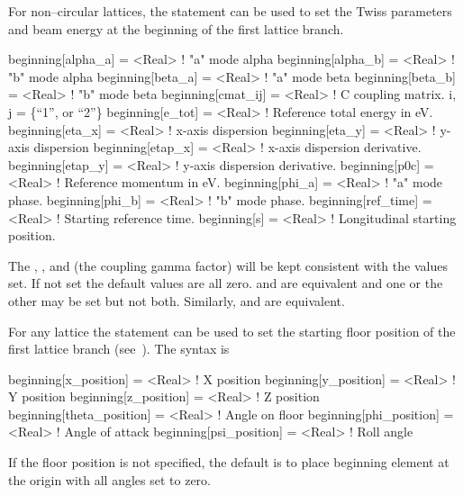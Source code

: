 For non--circular lattices, the  statement can be used to
set the Twiss parameters and beam energy at the beginning of the first lattice branch.
\begin{example}
  beginning[alpha_a]  = <Real>  ! "a" mode alpha
  beginning[alpha_b]  = <Real>  ! "b" mode alpha
  beginning[beta_a]   = <Real>  ! "a" mode beta
  beginning[beta_b]   = <Real>  ! "b" mode beta
  beginning[cmat_ij]  = <Real>  ! C coupling matrix. i, j = \{``1'', or ``2''\} 
  beginning[e_tot]    = <Real>  ! Reference total energy in eV.
  beginning[eta_x]    = <Real>  ! x-axis dispersion
  beginning[eta_y]    = <Real>  ! y-axis dispersion
  beginning[etap_x]   = <Real>  ! x-axis dispersion derivative.
  beginning[etap_y]   = <Real>  ! y-axis dispersion derivative.
  beginning[p0c]      = <Real>  ! Reference momentum in eV.
  beginning[phi_a]    = <Real>  ! "a" mode phase.
  beginning[phi_b]    = <Real>  ! "b" mode phase.
  beginning[ref_time] = <Real>  ! Starting reference time.
  beginning[s]        = <Real>  ! Longitudinal starting position.
\end{example}
The , , and  (the coupling gamma
factor) will be kept consistent with the values set. If not set the
default values are all zero.   and
 are equivalent and one or the other may be
set but not both. Similarly,  and
 are equivalent.

For any lattice the  statement can be used to set the
starting floor position of the first lattice branch
(see~). The syntax is
\begin{example}
  beginning[x_position]     = <Real>  ! X position
  beginning[y_position]     = <Real>  ! Y position
  beginning[z_position]     = <Real>  ! Z position
  beginning[theta_position] = <Real>  ! Angle on floor
  beginning[phi_position]   = <Real>  ! Angle of attack
  beginning[psi_position]   = <Real>  ! Roll angle
\end{example}
If the floor position is not specified, the default is to place
beginning element at the origin with all angles set to zero.

